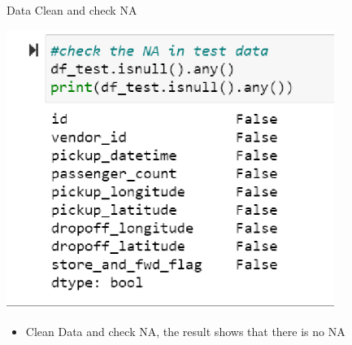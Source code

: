 \documentclass[
 size=14pt,
 paper=smartboard,  %
 mode=present, 		%
 display=slides, 	%
 style=tuliplab,  	%
 pauseslide,
 fleqn,leqno]{powerdot}
\begin{document}
\begin{slide}{Data Clean and check NA}
	{\begin{flushleft}
			\includegraphics[width=0.8\textwidth]{figures/pe3.eps}
		\end{flushleft}
	}

\begin{itemize}
	\item
	\smallskip
	Clean Data and check NA, the result shows that there is no NA 
	
\end{itemize}

\end{slide}
\end{document}
